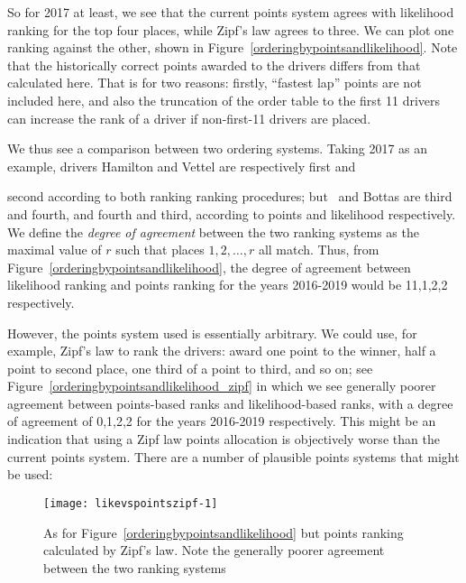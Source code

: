 \documentclass{elsarticle}
\begin{document}
\noindent So for 2017 at least, we see that the current points system
agrees with likelihood ranking for the top four places, while Zipf's
law agrees to three.  We can plot one ranking against the other, shown
in Figure~\ref{orderingbypointsandlikelihood}.  Note that the
historically correct points awarded to the drivers differs from that
calculated here.  That is for two reasons: firstly, ``fastest lap''
points are not included here, and also the truncation of the order
table to the first 11 drivers can increase the rank of a driver if
non-first-11 drivers are placed.

We thus see a comparison between two ordering systems.  Taking 2017 as
an example, drivers Hamilton and Vettel are respectively first and

second according to both ranking ranking procedures; but \raik\ and
Bottas are third and fourth, and fourth and third, according to points
and likelihood respectively. We define the \emph{degree of agreement}
between the two ranking systems as the maximal value of \(r\) such
that places \(1,2,\ldots, r\) all match.  Thus, from
Figure~\ref{orderingbypointsandlikelihood}, the degree of agreement
between likelihood ranking and points ranking for the years 2016-2019
would be 11,1,2,2 respectively.

However, the points system used is essentially arbitrary.  We could
use, for example, Zipf's law to rank the drivers: award one point to
the winner, half a point to second place, one third of a point to
third, and so on; see Figure~\ref{orderingbypointsandlikelihood_zipf}
in which we see generally poorer agreement between points-based ranks
and likelihood-based ranks, with a degree of agreement of 0,1,2,2 for
the years 2016-2019 respectively.  This might be an indication that
using a Zipf law points allocation is objectively worse than the
current points system.  There are a number of plausible points systems
that might be used:

\begin{figure}
{\centering \texttt{[image: likevspointszipf-1]}}
\caption[\doublespacing As for
  Figure~\ref{orderingbypointsandlikelihood} \label{orderingbypointsandlikelihood_zipf}
  but points ranking calculated by Zipf's law]{\doublespacing As for
  Figure~\ref{orderingbypointsandlikelihood} \label{orderingbypointsandlikelihood_zipf}
  but points ranking calculated by Zipf's law. Note the generally
  poorer agreement between the two ranking
  systems}\label{fig:likevspointszipf}
\end{figure}
\end{document}

